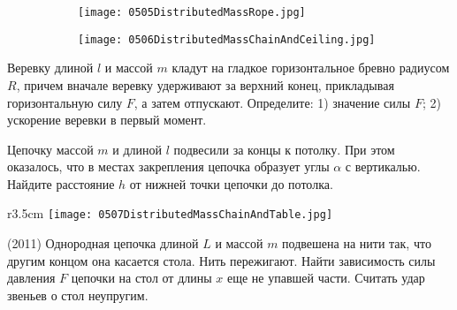 \begin{figure}[!h]
	\begin{subfigure}{.3\textwidth}
		\centering
		\texttt{[image: 0505DistributedMassRope.jpg]}
	\end{subfigure}		
	\begin{subfigure}{.7\textwidth}
		\centering
		\texttt{[image: 0506DistributedMassChainAndCeiling.jpg]}
	\end{subfigure}		
\end{figure}

\AddProb Веревку длиной $l$ и массой $m$ кладут на гладкое горизонтальное бревно радиусом $R$, 
причем вначале веревку удерживают за верхний конец, прикладывая горизонтальную силу $F$, а затем отпускают. 
Определите: 1) значение силы $F$; 2) ускорение веревки в первый момент.

\AddProb Цепочку массой $m$ и длиной $l$ подвесили за концы к потолку. 
При этом оказалось, что в местах закрепления цепочка образует углы $\alpha $ с вертикалью. 
Найдите расстояние $h$ от нижней точки цепочки до потолка.

\begin{wrapfigure}{r}{3.5cm}
\texttt{[image: 0507DistributedMassChainAndTable.jpg]}
\end{wrapfigure}

\AddProb (2011) Однородная цепочка длиной $L$ и массой $m$ подвешена на нити так, что другим концом она касается стола. 
Нить пережигают. Найти зависимость силы давления $F$ цепочки на стол от длины $x$ еще не упавшей части. Считать удар звеньев о стол неупругим.